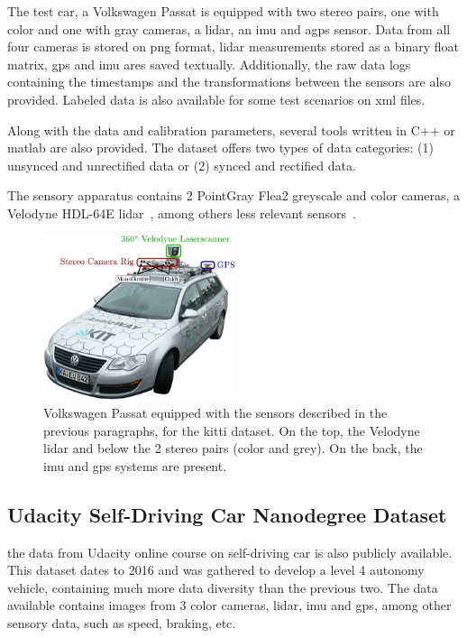 The test car, a Volkswagen Passat is equipped with two stereo pairs, one with color and one with gray cameras, a \ac{lidar}, an \ac{imu} and a\ac{gps} sensor. Data from all four cameras is stored on \ac{png} format, \ac{lidar} measurements stored as a binary float matrix, \ac{gps} and {imu} ares saved textually. Additionally, the raw data logs containing the timestamps and the transformations between the sensors are also provided. Labeled data is also available for some test scenarios on \ac{xml} files.

Along with the data and calibration parameters, several tools written in C++ or \ac{matlab} are also provided. The dataset offers two types of data categories: (1) unsynced and unrectified data or (2) synced and rectified data. 

The sensory apparatus contains 2 PointGray Flea2 greyscale and color cameras, a Velodyne HDL-64E \ac{lidar}~\cite{VelodyneHDL64}, among others less relevant sensors~\cite{Geiger2013a}.

\begin{figure}
	\centering
	\includegraphics[width=0.5\textwidth]{img/sensor_fusion/passat_sensors.jpg}
	\caption{Volkswagen Passat equipped with the sensors described in the previous paragraphs, for the \ac{kitti} dataset. On the top, the Velodyne \ac{lidar} and below the 2 stereo pairs (color and grey). On the back, the \ac{imu} and {gps} systems are present.}
	\label{fig:sota:kitti_sensors}
\end{figure}


\subsection{Udacity Self-Driving Car Nanodegree Dataset}
the data from Udacity online course on self-driving car is also publicly available. This dataset dates to 2016 and was gathered to develop a level 4 autonomy vehicle, containing much more data diversity than the previous two. The data available contains images from 3 color cameras,  \ac{lidar}, \ac{imu} and \ac{gps}, among other sensory data, such as speed, braking, etc.

